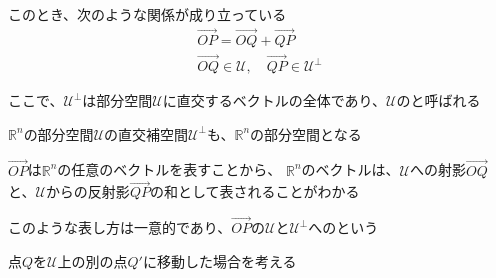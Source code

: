 \documentclass[../../../topic_linear-algebra]{subfiles}
\begin{document}
このとき、次のような関係が成り立っている
\begin{gather*}
  \overrightarrow{OP} = \overrightarrow{OQ} + \overrightarrow{QP} \\
  \overrightarrow{OQ} \in \mathcal{U}, \quad \overrightarrow{QP} \in \mathcal{U}^\perp
\end{gather*}

ここで、$\mathcal{U}^\perp$は部分空間$\mathcal{U}$に直交するベクトルの全体であり、$\mathcal{U}$のと呼ばれる

$\mathbb{R}^n$の部分空間$\mathcal{U}$の直交補空間$\mathcal{U}^\perp$も、$\mathbb{R}^n$の部分空間となる

\br

$\overrightarrow{OP}$は$\mathbb{R}^n$の任意のベクトルを表すことから、
$\mathbb{R}^n$のベクトルは、$\mathcal{U}$への射影$\overrightarrow{OQ}$と、$\mathcal{U}$からの反射影$\overrightarrow{QP}$の和として表されることがわかる

\br

このような表し方は一意的であり、$\overrightarrow{OP}$の$\mathcal{U}$と$\mathcal{U}^\perp$へのという

\sectionline

点$Q$を$\mathcal{U}$上の別の点$Q'$に移動した場合を考える
\end{document}
